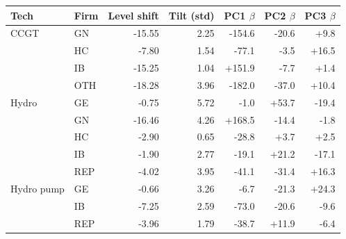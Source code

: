 \begin{tabular}{l l r r r r r}
\toprule
Tech & Firm & Level shift & Tilt (std) & PC1 $\beta$ & PC2 $\beta$ & PC3 $\beta$ \\
\midrule
CCGT & GN & -15.55 & 2.25 & -154.6 & -20.6 & +9.8 \\
 & HC & -7.80 & 1.54 & -77.1 & -3.5 & +16.5 \\
 & IB & -15.25 & 1.04 & +151.9 & -7.7 & +1.4 \\
 & OTH & -18.28 & 3.96 & -182.0 & -37.0 & +10.4 \\
\addlinespace
Hydro & GE & -0.75 & 5.72 & -1.0 & +53.7 & -19.4 \\
 & GN & -16.46 & 4.26 & +168.5 & -14.4 & -1.8 \\
 & HC & -2.90 & 0.65 & -28.8 & +3.7 & +2.5 \\
 & IB & -1.90 & 2.77 & -19.1 & +21.2 & -17.1 \\
 & REP & -4.02 & 3.95 & -41.1 & -31.4 & +16.3 \\
\addlinespace
Hydro pump & GE & -0.66 & 3.26 & -6.7 & -21.3 & +24.3 \\
 & IB & -7.25 & 2.59 & -73.0 & -20.6 & -9.6 \\
 & REP & -3.96 & 1.79 & -38.7 & +11.9 & -6.4 \\
\bottomrule
\end{tabular}